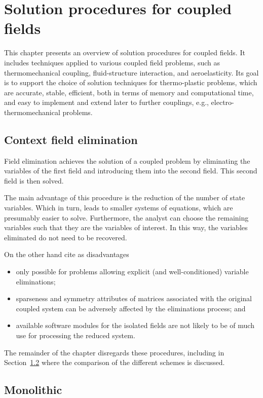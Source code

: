 
\chapter{Solution procedures for coupled fields}

This chapter presents an overview of solution procedures for coupled fields.
It includes techniques applied to various coupled field problems, such as thermomechanical coupling, fluid-structure interaction, and aeroelasticity.
Its goal is to support the choice of solution techniques for thermo-plastic problems, which are accurate, stable, efficient, both in terms of memory and computational time, and easy to implement and extend later to further couplings, e.g., electro\--thermomechanical problems.

\section{Context field elimination}

Field elimination achieves the solution of a coupled problem by eliminating the variables of the first field and introducing them into the second field.
This second field is then solved.

The main advantage of this procedure is the reduction of the number of state variables.
Which in turn, leads to smaller systems of equations, which are presumably easier to solve.
Furthermore, the analyst can choose the remaining variables such that they are the variables of interest.
In this way, the variables eliminated do not need to be recovered. \citep{felippa_staggered_1980}

On the other hand \cite{felippa_staggered_1980} cite as disadvantages
\begin{itemize}
  \item only possible for problems allowing explicit (and well-conditioned) variable eliminations;
  \item sparseness and symmetry attributes of matrices associated with the original coupled system can be adversely affected by the eliminations process; and
  \item available software modules for the isolated fields are not likely to be of much use for processing the reduced system.
\end{itemize}
The remainder of the chapter disregards these procedures, including in Section~\ref{} where the comparison of the different schemes is discussed.

\section{Monolithic}

